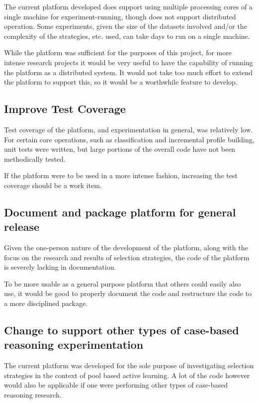 \documentclass[a4paper,11pt]{report}
\begin{document}
The current platform developed does support using multiple processing cores of a single machine for experiment-running, though does not support distributed operation. Some experiments, given the size of the datasets involved and/or the complexity of the strategies, etc. used, can take days to run on a single machine.

While the platform was sufficient for the purposes of this project, for more intense research projects it would be very useful to have the capability of running the platform as a distributed system. It would not take too much effort to extend the platform to support this, so it would be a worthwhile feature to develop.

\subsection{Improve Test Coverage}

Test coverage of the platform, and experimentation in general, was relatively low. For certain core operations, such as classification and incremental profile building, unit tests were written, but large portions of the overall code have not been methodically tested. 

If the platform were to be used in a more intense fashion, increasing the test coverage should be a work item.

\subsection{Document and package platform for general release}

Given the one-person nature of the development of the platform, along with the focus on the research and results of selection strategies, the code of the platform is severely lacking in documentation. 

To be more usable as a general purpose platform that others could easily also use, it would be good to properly document the code and restructure the code to a more disciplined package. 

\subsection{Change to support other types of case-based reasoning experimentation}

The current platform was developed for the sole purpose of investigating selection strategies in the context of pool based active learning. A lot of the code however would also be applicable if one were performing other types of case-based reasoning research.
\end{document}
